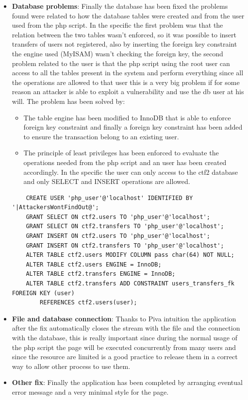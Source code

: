 \documentclass[14pt]{article}
\begin{document}
\begin{itemize}
	\item \textbf{Database problems}: Finally the database has been fixed the problems found were related to how the database tables were created and from the user used from the php script. In the specific the first problem was that the relation between the two tables wasn't enforced, so it was possible to insert transfers of users not registered, also by inserting the foreign key constraint the engine used (MyISAM) wasn't checking the foreign key, the second problem related to the user is that the php script using the root user can access to all the tables present in the system and perform everything since all the operations are allowed to that user this is a very big problem if for some reason an attacker is able to exploit a vulnerability and use the db user at his will.
	The problem has been solved by:
	\begin{itemize}
		\item The table engine has been modified to InnoDB that is able to enforce foreign key constraint and finally a foreign key constraint has been added to ensure the transaction belong to an existing user.
		
		\item The principle of least privileges has been enforced to evaluate the operations needed from the php script and an user has been created accordingly. In the specific the user can only access to the ctf2 database and only SELECT and INSERT operations are allowed.
	\end{itemize}
	\begin{Verbatim}
	CREATE USER 'php_user'@'localhost' IDENTIFIED BY '|AttackersWontFindOut@';
	GRANT SELECT ON ctf2.users TO 'php_user'@'localhost';
	GRANT SELECT ON ctf2.transfers TO 'php_user'@'localhost';
	GRANT INSERT ON ctf2.users TO 'php_user'@'localhost';
	GRANT INSERT ON ctf2.transfers TO 'php_user'@'localhost';
	ALTER TABLE ctf2.users MODIFY COLUMN pass char(64) NOT NULL;
	ALTER TABLE ctf2.users ENGINE = InnoDB;
	ALTER TABLE ctf2.transfers ENGINE = InnoDB;
	ALTER TABLE ctf2.transfers ADD CONSTRAINT users_transfers_fk FOREIGN KEY (user)
		REFERENCES ctf2.users(user);
	\end{Verbatim}
	
	\item \textbf{File and database connection}: Thanks to Piva intuition the application after the fix automatically closes the stream with the file and the connection with the database, this is really important since during the normal usage of the php script the page will be executed concurrently from many users and since the resource are limited is a good practice to release them in a correct way to allow other process to use them.
	
	\item \textbf{Other fix}: Finally the application has been completed by arranging eventual error message and a very minimal style for the page.
\end{itemize}
\end{document}
